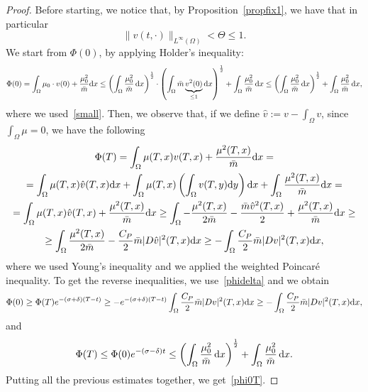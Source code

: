\documentclass[10pt,a4paper,nouppercase,nowrite]{article}
\numberwithin{equation}{section}
\newcommand{\di}{{\rm d}}
\theoremstyle{definition}
\begin{document}
	\begin{proof}
		Before starting, we notice that, by Proposition~\ref{propfix1}, we have that in particular
		\begin{equation}
			\|v(t,\cdot)\|_{L^{\infty}(\Omega)} < \Theta \le 1.
			\label{small}
		\end{equation}
		We start from $\Phi(0)$, by applying Holder's inequality:
		$$\Phi(0) = \int_{\Omega} \mu_0 \cdot v(0) + \frac{\mu_0^2}{\bar{m}} \di x \le \left( \int_{\Omega} \frac{\mu_0^2}{\bar{m}} \, \di x \right)^{\frac{1}{2}} \cdot \left( \int_{\Omega} \bar{m}\underbrace{v^2(0)}_{\le 1} \di x \right)^{\frac{1}{2}} + \int_{\Omega} \frac{\mu_0^2}{\bar{m}}\,  \di x \le \left( \int_{\Omega} \frac{\mu_0^2}{\bar{m}} \, \di x \right)^{\frac{1}{2}} + \int_{\Omega} \frac{\mu_0^2}{\bar{m}} \, \di x,$$
		where we used~\eqref{small}.
		Then, we observe that, if we define $\hat v:=v - \int_{\Omega} v$, since $\int_{\Omega} \mu = 0$, we have the following
		\begin{multline*}
			\Phi(T)=\int_{\Omega} \mu(T,x) v(T,x) + \frac{\mu^2(T,x)}{\bar{m}} \di x = \\ = \int_{\Omega} \mu(T,x) \hat v(T,x) \di x + \int_{\Omega} \mu(T,x)\left(\int_{\Omega} v(T,y) \di y \right)\di x + \int_{\Omega} \frac{\mu^2(T,x)}{\bar{m}} \di x  = \\ = \int_{\Omega} \mu(T,x) \hat v(T,x) +  \frac{\mu^2(T,x)}{\bar{m}} \di x \geq \int_{\Omega} - \frac{\mu^2(T,x)}{2\bar{m}} - \frac{\bar{m}\hat v^2(T,x)}{2} + \frac{\mu^2(T,x)}{\bar{m}} \di x \geq \\ \geq \int_{\Omega} \frac{\mu^2(T,x)}{2\bar{m}} - \frac{C_P}{2} \bar{m} |D \hat v|^2(T,x) \di x \geq -\int_{\Omega} \frac{C_P}{2} \bar{m} |Dv|^2(T,x) \di x,
	\end{multline*}
		where we used Young's inequality and we applied the weighted Poincaré inequality.
		To get the reverse inequalities, we use~\eqref{phidelta} and we obtain
		\begin{equation*}
			\Phi(0) \ge \Phi(T) e^{-(\sigma+\delta)(T-t)} \ge - e^{-(\sigma+\delta)(T-t)} \int_{\Omega} \frac{C_P}{2} \bar m |Dv|^2(T,x) \di x \ge -\int_{\Omega} \frac{C_P}{2} \bar m |Dv|^2(T,x) \di x,
		\end{equation*}
		and
		\begin{equation*}
			\Phi(T) \le \Phi(0) e^{-(\sigma-\delta)t} \le \left( \int_{\Omega} \frac{\mu_0^2}{\bar{m}} \, \di x \right)^{\frac{1}{2}} + \int_{\Omega} \frac{\mu_0^2}{\bar{m}} \, \di x.
		\end{equation*}
		Putting all the previous estimates together, we get~\eqref{phi0T}.
	\end{proof}
\end{document}
